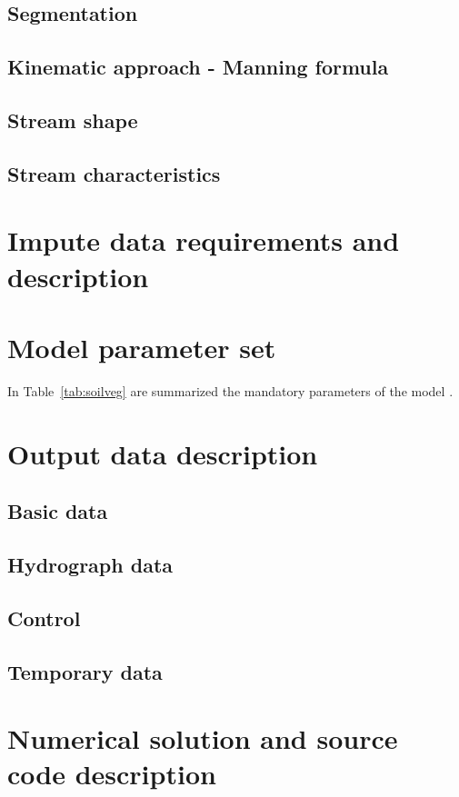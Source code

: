     \subsection{Segmentation}
    \subsection{Kinematic approach - Manning formula}
    \subsection{Stream shape}
    \subsection{Stream characteristics}

\section{Impute data requirements and description}

\section{Model parameter set}
In Table~\ref{tab:soilveg} are summarized the mandatory parameters of the model \smod.


\section{Output data description}

    \subsection{Basic data}
    \subsection{Hydrograph data}
    \subsection{Control}
    \subsection{Temporary data}

\section{Numerical solution and source code description}

